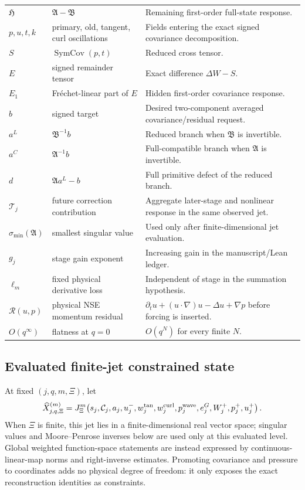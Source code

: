 \documentclass[12pt]{article}
\renewcommand{\arraystretch}{1.10}
\theoremstyle{plain}
\theoremstyle{definition}
\theoremstyle{remark}
\newcommand{\Rres}{\mathcal R}
\newcommand{\SymCov}{\operatorname{SymCov}}
\newcommand{\Flat}{O(q^{\infty})}
\newcommand{\Comp}{\mathfrak A}
\newcommand{\Red}{\mathfrak B}
\newcommand{\Hidden}{\mathfrak H}
\newcommand{\Tail}{\mathscr T}
\begin{document}
\begin{longtable}{>{\raggedright\arraybackslash}p{}>{\raggedright\arraybackslash}p{}>{\raggedright\arraybackslash}p{}}
\(\Hidden\) & \(\Comp-\Red\) & Remaining first-order full-state response. \\
\(p,u,t,k\) & primary, old, tangent, curl oscillations & Fields entering the exact signed covariance decomposition. \\
\(S\) & \(\SymCov(p,t)\) & Reduced cross tensor. \\
\(E\) & signed remainder tensor & Exact difference \(\Delta W-S\). \\
\(E_1\) & Fr\'echet-linear part of \(E\) & Hidden first-order covariance response. \\
\(b\) & signed target & Desired two-component averaged covariance/residual request. \\
\(a^L\) & \(\Red^{-1}b\) & Reduced branch when \(\Red\) is invertible. \\
\(a^C\) & \(\Comp^{-1}b\) & Full-compatible branch when \(\Comp\) is invertible. \\
\(d\) & \(\Comp a^L-b\) & Full primitive defect of the reduced branch. \\
\(\Tail_j\) & future correction contribution & Aggregate later-stage and nonlinear response in the same observed jet. \\
\(\sigma_{\min}(\Comp)\) & smallest singular value & Used only after finite-dimensional jet evaluation. \\
\(g_j\) & stage gain exponent & Increasing gain in the manuscript/Lean ledger. \\
\(\ell_m\) & fixed physical derivative loss & Independent of stage in the summation hypothesis. \\
\(\Rres(u,p)\) & physical NSE momentum residual & \(\partial_tu+(u\cdot\nabla)u-\Delta u+\nabla p\) before forcing is inserted. \\
\(\Flat\) & flatness at \(q=0\) & \(O(q^N)\) for every finite \(N\). \\
\bottomrule
\end{longtable}
\renewcommand{\arraystretch}{1}

\subsection{Evaluated finite-jet constrained state}
At fixed \((j,q,m,\Xi)\), let
\[
\widehat X_{j,q,\Xi}^{(m)}
=J^m_{\Xi}\!\left(
 s_j,\mathcal C_j,a_j,u_j^{-},w_j^{\rm tan},w_j^{\rm curl},
 p_j^{\rm wave},e_j^G,W_j^{+},p_j^{+},u_j^{+}
\right).
\]
When \(\Xi\) is finite, this jet lies in a finite-dimensional real vector space; singular values and Moore--Penrose inverses below are used only at this evaluated level. Global weighted function-space statements are instead expressed by continuous-linear-map norms and right-inverse estimates. Promoting covariance and pressure to coordinates adds no physical degree of freedom: it only exposes the exact reconstruction identities as constraints.
\end{document}
